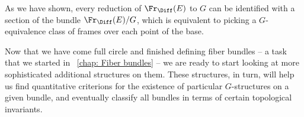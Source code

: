 As we have shown, every reduction of $\Fr_{\Diff}(E)$ to $G$ can be identified with a section of the bundle $\Fr_{\Diff}(E)\slash G$, which is equivalent to picking a $G$-equivalence class of frames over each point of the base.


Now that we have come full circle and finished defining fiber bundles -- a task that we started in \Chap~\ref{chap: Fiber bundles} -- we are ready to start looking at more sophisticated additional structures on them. These structures, in turn, will help us find quantitative criterions for the existence of particular $G$-structures on a given bundle, and eventually classify all bundles in terms of certain topological invariants.




